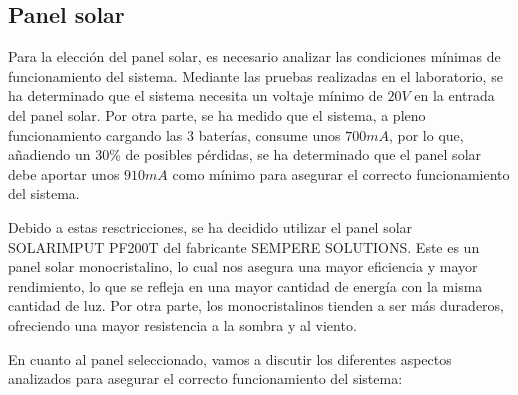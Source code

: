 \subsection{Panel solar}\label{subsec:panel_solar}
Para la elección del panel solar, es necesario analizar las condiciones mínimas de funcionamiento del sistema. Mediante las pruebas realizadas en el laboratorio, se ha determinado que el sistema necesita un voltaje mínimo de $20 V$ en la entrada del panel solar. Por otra parte, se ha medido que el sistema, a pleno funcionamiento cargando las 3 baterías, consume unos $700 mA$, por lo que, añadiendo un 30\% de posibles pérdidas, se ha determinado que el panel solar debe aportar unos $910 mA$ como mínimo para asegurar el correcto funcionamiento del sistema.

Debido a estas resctricciones, se ha decidido utilizar el panel solar SOLARIMPUT PF200T del fabricante SEMPERE SOLUTIONS. Este es un panel solar monocristalino, lo cual nos asegura una mayor eficiencia y mayor rendimiento, lo que se refleja en una mayor cantidad de energía con la misma cantidad de luz. Por otra parte, los monocristalinos tienden a ser más duraderos, ofreciendo una mayor resistencia a la sombra y al viento.\cite{autosolarDiferenciasEntreSilicio} 

En cuanto al panel seleccionado, vamos a discutir los diferentes aspectos analizados para asegurar el correcto funcionamiento del sistema:

